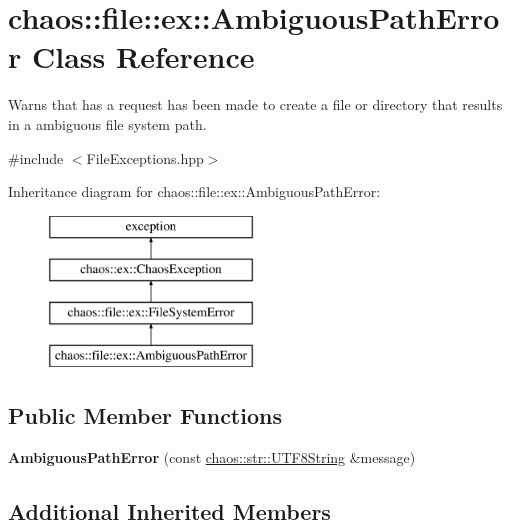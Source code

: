 \hypertarget{classchaos_1_1file_1_1ex_1_1_ambiguous_path_error}{}\section{chaos\+:\+:file\+:\+:ex\+:\+:Ambiguous\+Path\+Error Class Reference}
\label{classchaos_1_1file_1_1ex_1_1_ambiguous_path_error}


Warns that has a request has been made to create a file or directory that results in a ambiguous file system path.  




{\ttfamily \#include $<$File\+Exceptions.\+hpp$>$}

Inheritance diagram for chaos\+:\+:file\+:\+:ex\+:\+:Ambiguous\+Path\+Error\+:\begin{figure}[H]
\begin{center}
\leavevmode
\includegraphics[height=4.000000cm]{classchaos_1_1file_1_1ex_1_1_ambiguous_path_error}
\end{center}
\end{figure}
\subsection*{Public Member Functions}
\begin{DoxyCompactItemize}
\item 
\hypertarget{classchaos_1_1file_1_1ex_1_1_ambiguous_path_error_a14d86ae0e9b042325ca0a7ced07c9f4a}{}{\bfseries Ambiguous\+Path\+Error} (const \hyperlink{classchaos_1_1str_1_1_u_t_f8_string}{chaos\+::str\+::\+U\+T\+F8\+String} \&message)\label{classchaos_1_1file_1_1ex_1_1_ambiguous_path_error_a14d86ae0e9b042325ca0a7ced07c9f4a}

\end{DoxyCompactItemize}
\subsection*{Additional Inherited Members}


